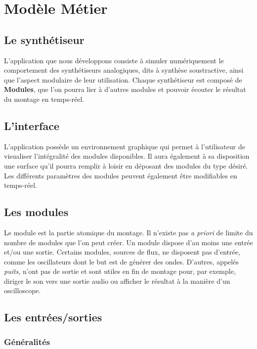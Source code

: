 \section{Modèle Métier}

\subsection{Le synthétiseur}

L'application que nous développons consiste à simuler numériquement
le comportement des synthétiseurs analogiques, dits à synthèse
soustractive, ainsi que l'aspect modulaire de leur utilisation.
Chaque synthétiseur est composé de \textbf{Modules}, que l'on
pourra lier à d'autres modules et pouvoir écouter le résultat du
montage en temps-réel.

\subsection{L'interface}

L'application possède un environnement graphique qui permet à
l'utilisateur de visualiser l'intégralité des modules disponibles.
Il aura également à sa disposition une surface qu'il pourra remplir
à loisir en déposant des modules du type désiré. Les différents
paramètres des modules peuvent également être modifiables en
temps-réel.

\subsection{Les modules}

Le module est la partie atomique du montage. Il n'existe pas \emph{a
priori} de limite du nombre de modules que l'on peut créer. Un
module dispose d'au moins une entrée et/ou une sortie. Certains
modules, sources de flux, ne disposent pas d'entrée, comme les
oscillateurs dont le but est de générer des ondes. D'autres, appelés
\emph{puits}, n'ont pas de sortie et sont utiles en fin de
montage pour, par exemple, diriger le son vers une sortie audio ou
afficher le résultat à la manière d'un oscilloscope.

\subsection{Les entrées/sorties}

\subsubsection{Généralités}
\label{ports-virtuels}

